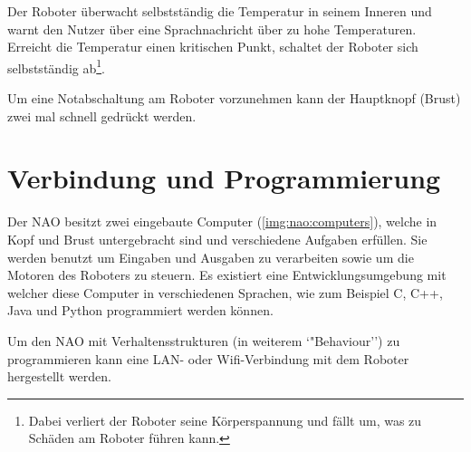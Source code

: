         Der Roboter überwacht selbstständig die Temperatur in seinem Inneren und
        warnt den Nutzer über eine Sprachnachricht über zu hohe Temperaturen.
        Erreicht die Temperatur einen kritischen Punkt, schaltet der Roboter
        sich selbstständig ab\footnote{Dabei verliert der Roboter seine
            Körperspannung und fällt um, was zu Schäden am Roboter führen
            kann.
        }.

        Um eine Notabschaltung am Roboter vorzunehmen kann der Hauptknopf
        (Brust) zwei mal schnell gedrückt werden.

    \section{Verbindung und Programmierung}

        Der NAO besitzt zwei eingebaute Computer (\autoref{img:nao:computers}),
        welche in Kopf und Brust
        untergebracht sind und verschiedene Aufgaben erfüllen.
        Sie werden benutzt um Eingaben und Ausgaben zu verarbeiten sowie um die
        Motoren des Roboters zu steuern.
        Es existiert eine Entwicklungsumgebung mit welcher diese Computer in
        verschiedenen Sprachen, wie zum Beispiel C, C++, Java und Python
        programmiert werden können.

        Um den NAO mit Verhaltensstrukturen (in weiterem `"Behaviour'') zu
        programmieren kann eine \ac{LAN}- oder \ac{Wifi}-Verbindung mit dem
        Roboter hergestellt werden.


